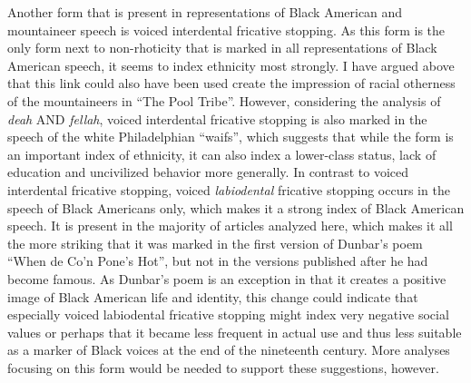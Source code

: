 Another form that is present in representations of Black American and mountaineer speech is voiced interdental fricative stopping. As this form is the only form next to non-rhoticity that is marked in all representations of Black American speech, it seems to index ethnicity most strongly. I have argued above that this link could also have been used create the impression of racial otherness of the mountaineers in “The Pool Tribe”. However, considering the analysis of \emph{deah} AND \emph{fellah}, voiced interdental fricative stopping is also marked in the speech of the white Philadelphian “waifs”, which suggests that while the form is an important index of ethnicity, it can also index a lower-class status, lack of education and uncivilized behavior more generally. In contrast to voiced interdental fricative stopping, voiced \emph{labiodental} fricative stopping occurs in the speech of Black Americans only, which makes it a strong index of Black American speech. It is present in the majority of articles analyzed here, which makes it all the more striking that it was marked in the first version of Dunbar’s poem “When de Co’n Pone’s Hot”, but not in the versions published after he had become famous. As Dunbar’s poem is an exception in that it creates a positive image of Black American life and identity, this change could indicate that especially voiced labiodental fricative stopping might index very negative social values or perhaps that it became less frequent in actual use and thus less suitable as a marker of Black voices at the end of the nineteenth century. More analyses focusing on this form would be needed to support these suggestions, however.

